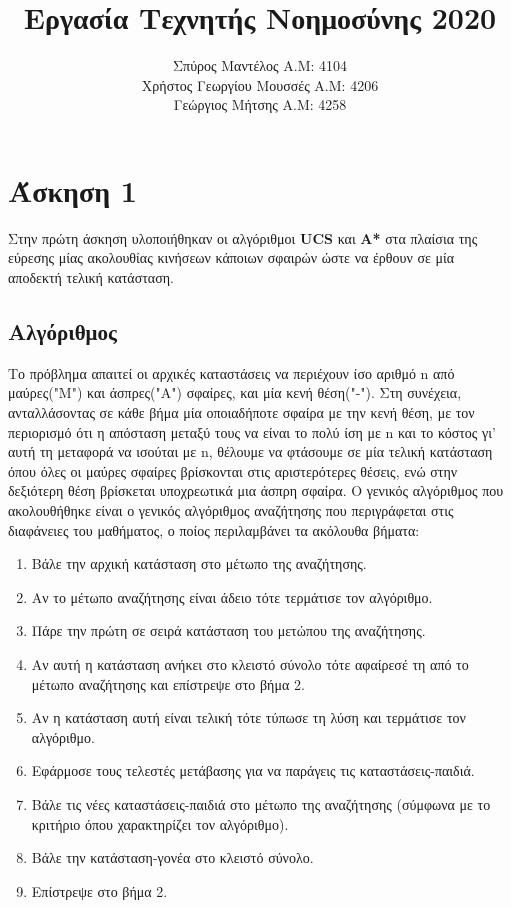 \documentclass{article}
\title{Εργασία Τεχνητής Νοημοσύνης 2020}
\author{Σπύρος Μαντέλος Α.Μ: 4104\\Χρήστος Γεωργίου Μουσσές Α.Μ: 4206\\Γεώργιος Μήτσης Α.Μ: 4258}
\date{}
\begin{document}
    \maketitle
    
    \section*{Άσκηση 1}
        Στην πρώτη άσκηση υλοποιήθηκαν οι αλγόριθμοι \textbf{UCS} και \textbf{A*} στα πλαίσια της εύρεσης μίας ακολουθίας κινήσεων κάποιων σφαιρών ώστε να έρθουν σε μία αποδεκτή τελική κατάσταση.
   
    \subsection*{Αλγόριθμος}
        Το πρόβλημα απαιτεί οι αρχικές καταστάσεις να περιέχουν ίσο αριθμό n από μαύρες("Μ") και άσπρες("Α") σφαίρες, και μία κενή θέση("-"). Στη συνέχεια, ανταλλάσοντας σε κάθε βήμα μία οποιαδήποτε σφαίρα με την κενή θέση, με τον περιορισμό ότι η απόσταση μεταξύ τους να είναι το πολύ ίση με n και το κόστος γι' αυτή τη μεταφορά να ισούται με n, θέλουμε να φτάσουμε σε μία τελική κατάσταση όπου όλες οι μαύρες σφαίρες βρίσκονται στις αριστερότερες θέσεις, ενώ στην δεξιότερη θέση βρίσκεται υποχρεωτικά μια άσπρη σφαίρα.
        Ο γενικός αλγόριθμος που ακολουθήθηκε είναι ο γενικός αλγόριθμος αναζήτησης που περιγράφεται στις διαφάνειες του μαθήματος, ο ποίος περιλαμβάνει τα ακόλουθα βήματα:
        \begin{enumerate}
          \item Βάλε την αρχική κατάσταση στο μέτωπο της αναζήτησης.
          \item Αν το μέτωπο αναζήτησης είναι άδειο τότε τερμάτισε τον αλγόριθμο.
          \item Πάρε την πρώτη σε σειρά κατάσταση του μετώπου της αναζήτησης.
          \item Αν αυτή η κατάσταση ανήκει στο κλειστό σύνολο τότε αφαίρεσέ τη από το μέτωπο αναζήτησης και επίστρεψε στο βήμα 2. 
          \item Αν η κατάσταση αυτή  είναι τελική τότε τύπωσε τη λύση και τερμάτισε τον αλγόριθμο.
          \item Εφάρμοσε τους τελεστές μετάβασης για να παράγεις τις καταστάσεις-παιδιά.
          \item Βάλε τις νέες καταστάσεις-παιδιά στο μέτωπο της αναζήτησης (σύμφωνα με το κριτήριο όπου χαρακτηρίζει τον αλγόριθμο).
          \item Βάλε την κατάσταση-γονέα στο κλειστό σύνολο. 
          \item Επίστρεψε στο βήμα 2.
        \end{enumerate}
\end{document}
